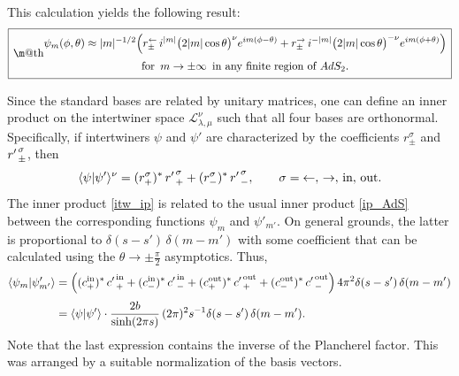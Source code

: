 \documentclass[11pt]{article}
\makeatletter
\newcommand*{\wideboxed}[1]{\setlength{\fboxsep}{1ex}%
  \fbox{\m@th$\displaystyle#1$}}
\newcommand*{\braket}[2]{\langle{#1}|{#2}\rangle}
\newcommand{\calL}{\mathcal{L}}
\DeclareMathOperator{\AdS}{AdS}
\newcommand{\lar}{{\leftarrow}}
\newcommand{\rar}{{\rightarrow}}
\newcommand{\IN}{\text{in}}
\newcommand{\OUT}{\text{out}}
\def\widetilde#1{#1}%
\def\AdS{AdS}
\makeatother
\begin{document}
This calculation yields the following result:
\begin{equation}\label{minfty}
\wideboxed{
\begin{gathered}
\psi_m(\phi,\theta)\approx
|m|^{-1/2}\Bigl(
r^{\lar}_{\pm}\,i^{|m|}\bigl(2|m|\cos\theta\bigr)^{\nu}e^{im(\phi-\theta)}
+r^{\rar}_{\pm}\,i^{-|m|}\bigl(2|m|\cos\theta\bigr)^{-\nu}e^{im(\phi+\theta)}
\Bigr)\\[2pt]
\text{for }\, m\to\pm\infty\,
\text{ in any finite region of $\widetilde{\AdS}_2$}.
\end{gathered}
}
\end{equation}

Since the standard bases are related by unitary matrices, one can define an inner product on the intertwiner space $\calL^{\nu}_{\lambda,\mu}$ such that all four bases are orthonormal. Specifically, if intertwiners $\psi$ and $\psi'$ are characterized by the coefficients $r^{\sigma}_{\pm}$ and ${r'\kern1pt}^{\sigma}_{\pm}$, then
\begin{equation}\label{itw_ip}
\braket{\psi}{\psi'}^{\nu}
=(r^{\sigma}_{+})^{*}\,{r'\kern1pt}^{\sigma}_{+}
+(r^{\sigma}_{-})^{*}\,{r'\kern1pt}^{\sigma}_{-},\qquad
\sigma=\lar,\,\rar,\,\IN,\,\OUT.
\end{equation}
The inner product \eqref{itw_ip} is related to the usual inner product \eqref{ip_AdS} between the corresponding functions $\psi_{m}$ and $\psi'_{m'}$. On general grounds, the latter is proportional to $\delta(s-s')\,\delta(m-m')$ with some coefficient that can be calculated using the $\theta\to\pm\frac{\pi}{2}$ asymptotics. Thus,
\begin{align}
\nonumber
\braket{\psi_m}{\psi'_{m'}}&=
\Bigl((c_{+}^{\IN})^{*}\,{c'\kern1pt}_{+}^{\IN}
+(c_{-}^{\IN})^{*}\,{c'\kern1pt}_{-}^{\IN}
+(c_{+}^{\OUT})^{*}\,{c'\kern1pt}_{+}^{\OUT}
+(c_{-}^{\OUT})^{*}\,{c'\kern1pt}_{-}^{\OUT}\Bigr)\,
4\pi^2\delta(s-s')\,\delta(m-m')
\\[3pt]
\label{op_ip}
&=\braket{\psi}{\psi'}\cdot
\frac{2b}{\sinh(2\pi s)}\,(2\pi)^2
s^{-1}\delta(s-s')\,\delta(m-m').
\end{align}
Note that the last expression contains the inverse of the Plancherel factor. This was arranged by a suitable normalization of the basis vectors.
\end{document}
